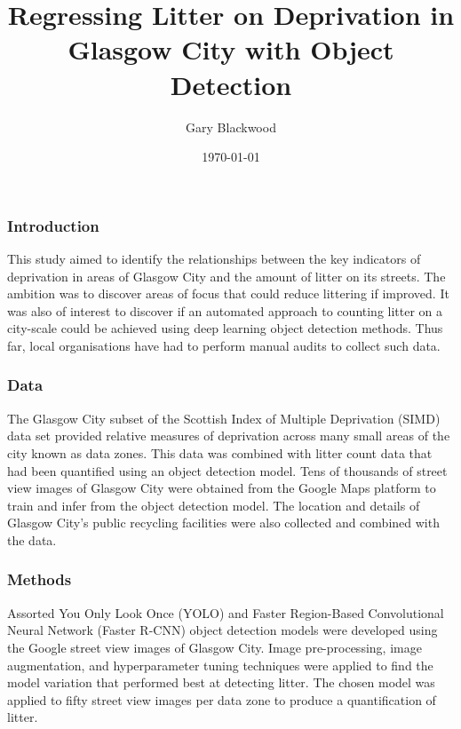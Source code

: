 \documentclass[10pt]{article}
\begin{document}
\title{Regressing Litter on Deprivation in Glasgow City with Object Detection}
\author{Gary Blackwood}
\date{\today}
\maketitle
\thispagestyle{empty} %

\subsubsection*{Introduction}

This study aimed to identify the relationships between the key indicators of deprivation in areas of
Glasgow City and the amount of litter on its streets. The ambition was to discover areas of focus that could
reduce littering if improved. It was also of interest to discover if an automated approach to counting litter on
a city-scale could be achieved using deep learning object detection methods. Thus far, local organisations
have had to perform manual audits to collect such data.

\subsubsection*{Data}

The Glasgow City subset of the Scottish Index of Multiple Deprivation (SIMD) data set provided relative measures of deprivation across many small areas of the city known as data zones. This data was combined with litter count data that had been quantified using an object detection model. Tens of thousands of street view images of Glasgow City were obtained from the Google Maps platform to train and infer from the object detection model. The location and details of Glasgow City's public recycling facilities were also collected and combined with the data.


\subsubsection*{Methods}

Assorted You Only Look Once (YOLO) and Faster Region-Based Convolutional Neural Network (Faster R-CNN) object detection models were developed using the Google street view images of Glasgow City. Image pre-processing, image augmentation, and hyperparameter tuning techniques were applied to find the model variation that performed best at detecting litter. The chosen model was applied to fifty street view images per data zone to produce a quantification of litter.
\end{document}
